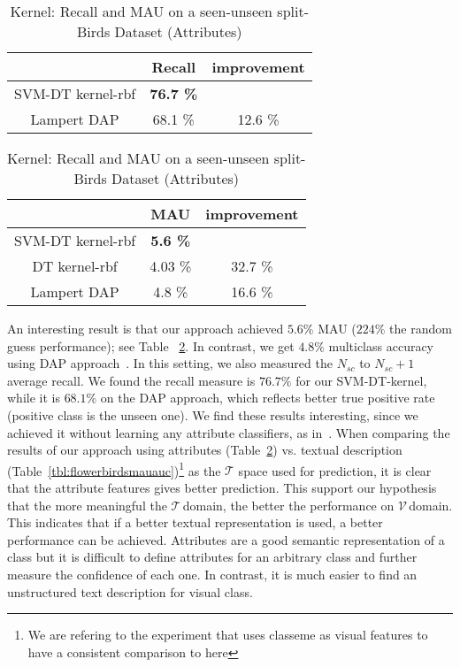    
\begin{table}
\centering
 \caption{Kernel: Recall and MAU on a seen-unseen split-Birds Dataset (Attributes)} 
\label{tbl:birds3}
 \vspace{-1mm}
\scalebox{1.0}
  {
\begin{tabular}{|c|c|c|}
\hline 
 & Recall & improvement \\ 
\hline 
{SVM-DT kernel-rbf }& \textbf{76.7  \%} &   \\ 
\hline 
Lampert DAP  {\cite{Lampert09}} & 68.1  \% & 12.6 \% \\ 
\hline 
\end{tabular}
 }

    \scalebox{1.0}
  {
\begin{tabular}{|c|c|c|}
\hline 
 & MAU & improvement \\ 
\hline 
{SVM-DT kernel-rbf }& \textbf{5.6  \%} &   \\ 
\hline 
{DT kernel-rbf }& {4.03 \%} &  32.7 \% \\ 
\hline 
Lampert DAP {  \cite{Lampert09}} & 4.8  \% & 16.6 \% \\ 
\hline 
\end{tabular}}

 \vspace{-2mm}
\end{table}

An interesting result is that our approach achieved $5.6\%$  MAU ($224\%$ the random guess performance); see Table ~\ref{tbl:birds3}. In contrast, we get $4.8\%$ multiclass accuracy using  DAP approach~\cite{lampertPAMI13}. In this setting, we also measured the $N_{sc}$ to $ N_{sc}+1$ average recall. We found the recall measure is $76.7\%$ for our SVM-DT-kernel, while it is $68.1\%$ on  the DAP approach, which reflects better true positive rate (positive class is the unseen one). We find these results interesting, since we achieved it without learning any attribute classifiers, as in~\cite{lampertPAMI13}. When comparing the results  of our approach using attributes (Table~\ref{tbl:birds3}) vs. textual description (Table~\ref{tbl:flowerbirdsmauauc})\footnote{We are refering to the experiment that uses classeme as visual features to have a consistent comparison to here} as the $\mathcal{T}$ space used for prediction, it is clear that the attribute features gives better prediction. This support our hypothesis that the more meaningful the \small$\mathcal{T}\,$\normalsize domain, the better the performance on \small$\mathcal{V}\,$\normalsize domain. This indicates that if a better textual representation is used, a better performance can be achieved. Attributes are a good semantic representation of a class but it is difficult to  define attributes for an arbitrary class and further measure the confidence of each one. In contrast, it is much easier to find an unstructured  text description for visual class. 



